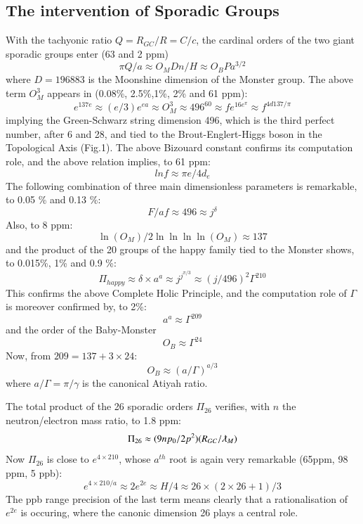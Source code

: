 \documentclass[twoside,draft]{article}
\begin{document}
\begin{sloppypar}
\subsection{The intervention of Sporadic Groups}

With the tachyonic ratio $Q = R_{GC}/R = C/c$, the cardinal orders of the two giant sporadic groups enter (63 and 2 ppm)
\begin{equation}
\pi Q/a \approx O_M D n/H \approx O_B P a^{3/2}
\end{equation}
where $D = 196883$ is the Moonshine dimension of the Monster group.
The above term $O_M^3$ appears in (0.08\%, 2.5\%,1\%, 2\% and 61 ppm):
\begin{equation}
e^{137e}\approx (e/3)e^{ea}\approx O_M^3 \approx 496^{60} \approx fe^{16e^\pi} \approx f^{4d137/\pi}
\end{equation}
implying the Green-Schwarz string dimension 496, which is the third perfect number, after 6 and 28, and tied to the Brout-Englert-Higgs boson in the Topological Axis (Fig.1). The above Bizouard constant confirms its computation role, and the above relation implies, to 61 ppm:
\begin{equation}
lnf\approx \pi e/4d_e
\end{equation}
The following combination of three main dimensionless parameters is remarkable, to 0.05 \% and 0.13 \%:
\begin{equation}
F/af \approx 496\approx j^{\delta}
\end{equation}
Also, to 8 ppm: $$\ln(O_{M}) /2\ln\ln\ln\ln(O_{M}) \approx 137$$ and the product of the 20 groups of the happy family tied
to the Monster shows, to 0.015\%, 1\% and 0.9 \%:
\begin{equation}
\Pi_{happy} \approx \delta \times a^{a} \approx j^{j^{\pi/3}} \approx (j/496)^2 \Gamma^{210}
\end{equation}
This confirms the above Complete Holic Principle, and the computation role of $\Gamma$ is moreover confirmed by, to 2\%: $$a^a \approx \Gamma^{209}$$ and the order of the Baby-Monster $$O_B\approx\Gamma^{24}$$ Now, from $209 = 137 + 3\times 24$:
\begin{equation}
O_B \approx (a/\Gamma)^{a/3}
\end{equation}
where $a/\Gamma = \pi/\gamma $ is the canonical Atiyah ratio.

The total product of the 26 sporadic orders $\Pi_{26}$ verifies, with $n$ the neutron/electron mass ratio, to 1.8 ppm:
$$ \Pi_{26} \approx (9np_0/2p^2)(R_{GC}/\lambdabar_M )$$
Now $\Pi_{26}$ is close to $e^{4 \times 210}$, whose $a^{th}$ root is again very remarkable (65ppm, 98 ppm, 5 ppb):
\begin{equation}
e^{4 \times 210/a} \approx 2e^{2e} \approx H/4 \approx 26 \times (2 \times 26 + 1)/3
\end{equation}
The ppb range precision of the last term means clearly that a rationalisation of $e^{2e}$ is occuring, where the canonic dimension 26 plays a central role.


\end{sloppypar}
\end{document}
